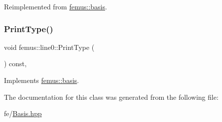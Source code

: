 Reimplemented from \mbox{\hyperlink{classfemus_1_1basis_a89b0797cdccffae5ff6d059b32016ae5}{femus\+::basis}}.

\mbox{\label{classfemus_1_1line0_a34e5a0791c0d6fe2d4fd3caf2bb51ff2}} 
\subsubsection{\texorpdfstring{Print\+Type()}{PrintType()}}
{\footnotesize\ttfamily void femus\+::line0\+::\+Print\+Type (\begin{DoxyParamCaption}{ }\end{DoxyParamCaption}) const\hspace{0.3cm}{\ttfamily [inline]}, {\ttfamily [virtual]}}



Implements \mbox{\hyperlink{classfemus_1_1basis_abbae7bf8f31ec5793c911bc6d4ea0572}{femus\+::basis}}.



The documentation for this class was generated from the following file\+:\begin{DoxyCompactItemize}
\item 
fe/\mbox{\hyperlink{_basis_8hpp}{Basis.\+hpp}}\end{DoxyCompactItemize}
